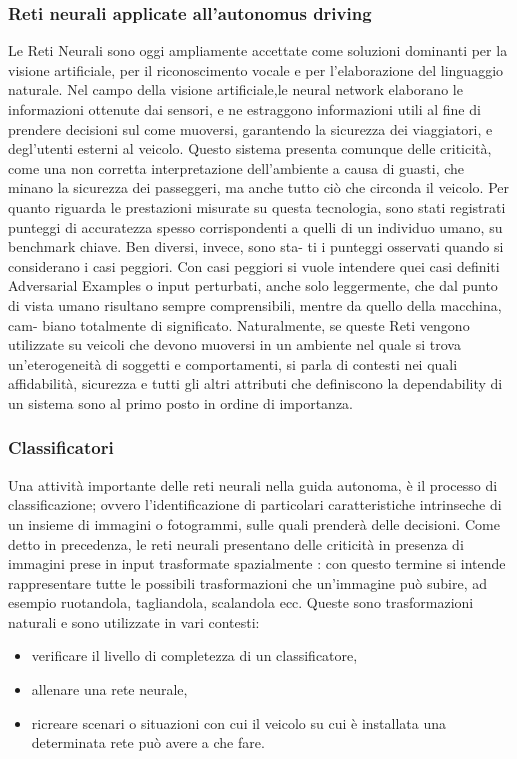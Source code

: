 \documentclass[14pt]{extarticle}
\begin{document}
\subsubsection{Reti neurali applicate all'autonomus driving}
Le Reti Neurali sono oggi ampliamente accettate come soluzioni dominanti per la visione artificiale, per il riconoscimento vocale e per l’elaborazione del linguaggio naturale. Nel campo della visione artificiale,le neural network elaborano le informazioni ottenute dai sensori, e ne estraggono informazioni utili al fine di prendere decisioni sul come muoversi, garantendo la sicurezza dei viaggiatori, e degl'utenti esterni al veicolo. 
Questo sistema presenta comunque delle criticità, come una non corretta interpretazione dell'ambiente a causa di guasti, che minano la sicurezza dei passeggeri, ma anche tutto ciò che circonda il veicolo.%
Per quanto riguarda le prestazioni misurate su questa tecnologia, sono stati
registrati punteggi di accuratezza spesso corrispondenti a quelli di un
individuo umano, su benchmark chiave. Ben diversi, invece, sono sta-
ti i punteggi osservati quando si considerano i casi peggiori. Con casi
peggiori si vuole intendere quei casi definiti Adversarial Examples \cite{engstrom2019exploring} o
input perturbati, anche solo leggermente, che dal punto di vista umano
risultano sempre comprensibili, mentre da quello della macchina, cam-
biano totalmente di significato. Naturalmente, se queste Reti vengono
utilizzate su veicoli che devono muoversi in un ambiente nel quale si
trova un’eterogeneità di soggetti e comportamenti, si parla di contesti
nei quali affidabilità, sicurezza e tutti gli altri attributi che definiscono la
dependability di un sistema sono al primo posto in ordine di importanza.

\subsubsection{Classificatori}
Una attività importante delle reti neurali nella guida autonoma, è il processo di classificazione; ovvero l'identificazione di particolari caratteristiche  intrinseche di un insieme di immagini o fotogrammi, sulle quali prenderà delle decisioni.
Come detto in precedenza, le reti neurali presentano delle criticità in presenza di immagini prese in input trasformate spazialmente \cite{engstrom2019exploring}: con
questo termine si intende rappresentare tutte le possibili trasformazioni
che un’immagine può subire, ad esempio ruotandola, tagliandola, scalandola ecc. Queste sono trasformazioni naturali e sono utilizzate in vari
contesti:
\begin{itemize}
\item verificare il livello di completezza di un classificatore,
\item allenare una rete neurale,
\item ricreare scenari o situazioni con cui il veicolo su cui è installata una
determinata rete può avere a che fare.
\end{itemize}
\end{document}
